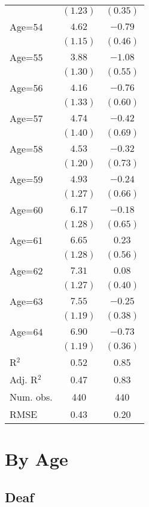 \documentclass[fullpage]{paper}
\begin{document}
\begin{center}
\begin{longtable}{l c c }
            & $(1.23)$ & $(0.35)$ \\
Age=54      & $4.62$   & $-0.79$  \\
            & $(1.15)$ & $(0.46)$ \\
Age=55      & $3.88$   & $-1.08$  \\
            & $(1.30)$ & $(0.55)$ \\
Age=56      & $4.16$   & $-0.76$  \\
            & $(1.33)$ & $(0.60)$ \\
Age=57      & $4.74$   & $-0.42$  \\
            & $(1.40)$ & $(0.69)$ \\
Age=58      & $4.53$   & $-0.32$  \\
            & $(1.20)$ & $(0.73)$ \\
Age=59      & $4.93$   & $-0.24$  \\
            & $(1.27)$ & $(0.66)$ \\
Age=60      & $6.17$   & $-0.18$  \\
            & $(1.28)$ & $(0.65)$ \\
Age=61      & $6.65$   & $0.23$   \\
            & $(1.28)$ & $(0.56)$ \\
Age=62      & $7.31$   & $0.08$   \\
            & $(1.27)$ & $(0.40)$ \\
Age=63      & $7.55$   & $-0.25$  \\
            & $(1.19)$ & $(0.38)$ \\
Age=64      & $6.90$   & $-0.73$  \\
            & $(1.19)$ & $(0.36)$ \\
\hline
R$^2$       & 0.52     & 0.85     \\
Adj. R$^2$  & 0.47     & 0.83     \\
Num. obs.   & 440      & 440      \\
RMSE        & 0.43     & 0.20     \\
\end{longtable}
\end{center}
\section{ By Age }

\subsection{ Deaf }
\end{document}
